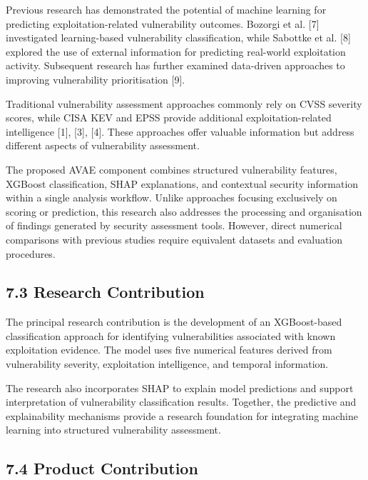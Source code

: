 \documentclass[
]{article}
\begin{document}
Previous research has demonstrated the potential of machine learning for
predicting exploitation-related vulnerability outcomes. Bozorgi et al.
{[}7{]} investigated learning-based vulnerability classification, while
Sabottke et al. {[}8{]} explored the use of external information for
predicting real-world exploitation activity. Subsequent research has
further examined data-driven approaches to improving vulnerability
prioritisation {[}9{]}.

Traditional vulnerability assessment approaches commonly rely on CVSS
severity scores, while CISA KEV and EPSS provide additional
exploitation-related intelligence {[}1{]}, {[}3{]}, {[}4{]}. These
approaches offer valuable information but address different aspects of
vulnerability assessment.

The proposed AVAE component combines structured vulnerability features,
XGBoost classification, SHAP explanations, and contextual security
information within a single analysis workflow. Unlike approaches
focusing exclusively on scoring or prediction, this research also
addresses the processing and organisation of findings generated by
security assessment tools. However, direct numerical comparisons with
previous studies require equivalent datasets and evaluation procedures.

\hypertarget{research-contribution}{%
\subsection{7.3 Research Contribution}\label{research-contribution}}

The principal research contribution is the development of an
XGBoost-based classification approach for identifying vulnerabilities
associated with known exploitation evidence. The model uses five
numerical features derived from vulnerability severity, exploitation
intelligence, and temporal information.

The research also incorporates SHAP to explain model predictions and
support interpretation of vulnerability classification results.
Together, the predictive and explainability mechanisms provide a
research foundation for integrating machine learning into structured
vulnerability assessment.

\hypertarget{product-contribution}{%
\subsection{7.4 Product Contribution}\label{product-contribution}}
\end{document}
